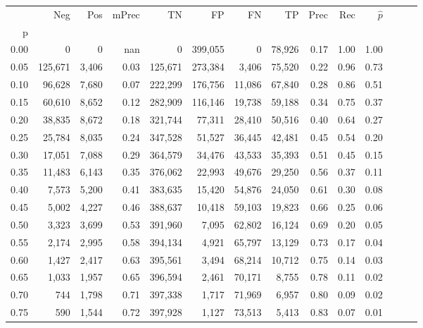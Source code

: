 \begin{tabular}{rrrrrrrrrrrrrr}
\toprule
{} &      Neg &    Pos & mPrec &       TN &       FP &      FN &      TP &  Prec &   Rec & $\hat{p}$ \\
p    &          &        &       &          &          &         &         &       &       &           \\
\midrule
0.00 &        0 &      0 &   nan &        0 &  399,055 &       0 &  78,926 &  0.17 &  1.00 &      1.00 \\
0.05 &  125,671 &  3,406 &  0.03 &  125,671 &  273,384 &   3,406 &  75,520 &  0.22 &  0.96 &      0.73 \\
0.10 &   96,628 &  7,680 &  0.07 &  222,299 &  176,756 &  11,086 &  67,840 &  0.28 &  0.86 &      0.51 \\
0.15 &   60,610 &  8,652 &  0.12 &  282,909 &  116,146 &  19,738 &  59,188 &  0.34 &  0.75 &      0.37 \\
0.20 &   38,835 &  8,672 &  0.18 &  321,744 &   77,311 &  28,410 &  50,516 &  0.40 &  0.64 &      0.27 \\
0.25 &   25,784 &  8,035 &  0.24 &  347,528 &   51,527 &  36,445 &  42,481 &  0.45 &  0.54 &      0.20 \\
0.30 &   17,051 &  7,088 &  0.29 &  364,579 &   34,476 &  43,533 &  35,393 &  0.51 &  0.45 &      0.15 \\
0.35 &   11,483 &  6,143 &  0.35 &  376,062 &   22,993 &  49,676 &  29,250 &  0.56 &  0.37 &      0.11 \\
0.40 &    7,573 &  5,200 &  0.41 &  383,635 &   15,420 &  54,876 &  24,050 &  0.61 &  0.30 &      0.08 \\
0.45 &    5,002 &  4,227 &  0.46 &  388,637 &   10,418 &  59,103 &  19,823 &  0.66 &  0.25 &      0.06 \\
0.50 &    3,323 &  3,699 &  0.53 &  391,960 &    7,095 &  62,802 &  16,124 &  0.69 &  0.20 &      0.05 \\
0.55 &    2,174 &  2,995 &  0.58 &  394,134 &    4,921 &  65,797 &  13,129 &  0.73 &  0.17 &      0.04 \\
0.60 &    1,427 &  2,417 &  0.63 &  395,561 &    3,494 &  68,214 &  10,712 &  0.75 &  0.14 &      0.03 \\
0.65 &    1,033 &  1,957 &  0.65 &  396,594 &    2,461 &  70,171 &   8,755 &  0.78 &  0.11 &      0.02 \\
0.70 &      744 &  1,798 &  0.71 &  397,338 &    1,717 &  71,969 &   6,957 &  0.80 &  0.09 &      0.02 \\
0.75 &      590 &  1,544 &  0.72 &  397,928 &    1,127 &  73,513 &   5,413 &  0.83 &  0.07 &      0.01 \\

\end{tabular}
